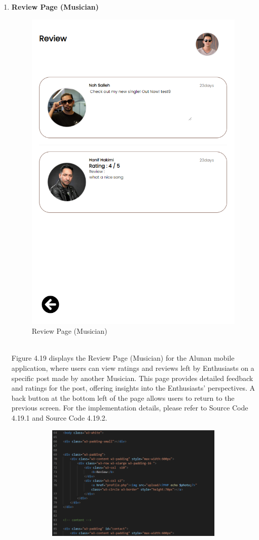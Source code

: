 \begin{enumerate}[1.]
    \item \textbf{Review Page (Musician)}
    \begin{figure}[h]
        \centering
        \includegraphics[width=0.5\linewidth]{mainmatter/images/frontend/ss/Review (Musician).png}
        \caption{Review Page (Musician)}
        \label{fig:myfig58}
    \end{figure} \\
    Figure 4.19 displays the Review Page (Musician) for the Alunan mobile application, where users can view ratings and reviews left by Enthusiasts on a specific post made by another Musician. This page provides detailed feedback and ratings for the post, offering insights into the Enthusiasts' perspectives. A back button at the bottom left of the page allows users to return to the previous screen. For the implementation details, please refer to Source Code 4.19.1 and Source Code 4.19.2.
    \clearpage
    \begin{figure}[h]\ContinuedFloat
        \centering
        \begin{subfigure}[b]{0.8\textwidth}
            \centering
            \includegraphics[width=\textwidth]{mainmatter/images/frontend/code/mreview.png}

\end{subfigure}
\end{figure}
\end{enumerate}
